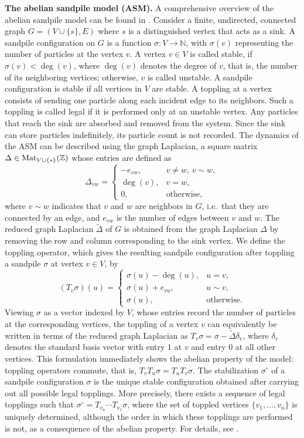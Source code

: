 \documentclass[11pt]{article}
\newcommand{\N}{\mathbb{N}}
\newcommand{\Z}{\mathbb{Z}}
\begin{document}
\textbf{The abelian sandpile model (ASM).}
A comprehensive overview of the abelian sandpile model can be found in \cite{J18}. 
Consider a finite, undirected, connected graph $G=(V \cup \{s\},E)$ where $s$ is a distinguished vertex that acts as a sink. A sandpile configuration on $G$ is a function $\sigma:V \rightarrow \N$,  with $\sigma(v)$ representing the number of particles at the vertex $v$. 
A vertex $v \in V$ is called stable, if $\sigma(v)<\deg(v)$, where $\deg(v)$ denotes the degree of $v$, that is, the number of its neighboring vertices; otherwise, $v$ is called unstable. A sandpile configuration is stable if all vertices in $V$ are stable. A toppling at a vertex consists of sending one particle along each incident edge to its neighbors. Such a toppling is called legal if it is performed only at an unstable vertex. Any particles that reach the sink are absorbed and removed from the system. Since the sink can store particles indefinitely, its particle count is not recorded.
The dynamics of the ASM can be described using the graph Laplacian, a square matrix $\Delta\in {\rm Mat}_{V\cup \{s\}}(\Z)$ whose entries are defined as
\[\Delta_{vw}=
\begin{cases}
    -e_{vw}, &  v \neq w, \, v \sim w,\\
    \deg(v), & v = w,\\
    0, & \text{otherwise,}
\end{cases}\]
where $v \sim w$ indicates that $v$ and $w$ are neighbors in $G$, i.e.~that they are connected by an edge, and $e_{vw}$ is the number of edges between $v$ and $w$. The reduced graph Laplacian $\tilde{\Delta} $ of $G$ is obtained from the graph Laplacian $\Delta$ by removing the row and column corresponding to the sink vertex. We define the toppling operator, which gives the resulting sandpile configuration after toppling a sandpile $\sigma$ at vertex $v \in V$, by
\[(T_v\sigma)(u)=
\begin{cases}
    \sigma(u)-\deg(u), & u=v,\\
    \sigma(u) + e_{vu}, & u \sim v,\\
    \sigma(u), & \text{otherwise.}
\end{cases}\]
Viewing $\sigma$ as a vector indexed by $V$, whose entries record the number of particles at the corresponding vertices, the toppling of a vertex $v$ can equivalently be written in terms of the reduced graph Laplacian as $T_v\sigma=\sigma-\widetilde{\Delta}\delta_v$,
where $\delta_v$ denotes the standard basis vector with entry $1$ at $v$ and entry $0$ at all other vertices. This formulation immediately shows the abelian property of the model: toppling operators commute, that is, $T_vT_u\sigma=T_uT_v\sigma$.
The stabilization $\sigma^\circ$ of a sandpile configuration $\sigma$ is the unique stable configuration obtained after carrying out all possible legal topplings. More precisely, there exists a sequence of legal topplings such that $\sigma^\circ = T_{v_n}\cdots T_{v_1}\sigma$, where the set of toppled vertices $\{v_1,\dots,v_n\}$ is uniquely determined, although the order in which these topplings are performed is not, as a consequence of the abelian property. For  details, see \cite{J18}.
\end{document}
